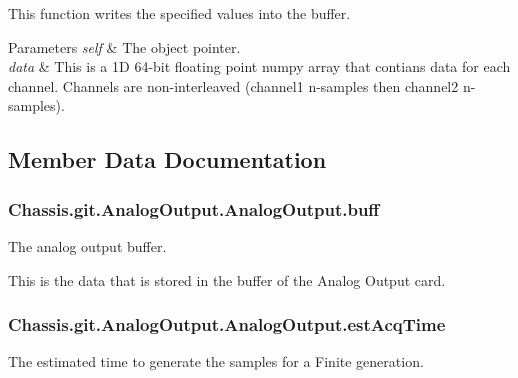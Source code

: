 This function writes the specified values into the buffer. 


\begin{DoxyParams}{Parameters}
{\em self} & The object pointer. \\
\hline
{\em data} & This is a 1\-D 64-\/bit floating point numpy array that contians data for each channel. Channels are non-\/interleaved (channel1 n-\/samples then channel2 n-\/samples). \\
\hline
\end{DoxyParams}


\subsection{Member Data Documentation}
\hypertarget{class_chassis_8git_1_1_analog_output_1_1_analog_output_a3b5a60696ee0dfe637469f9087367933}{
\subsubsection[{buff}]{\setlength{\rightskip}{0pt plus 5cm}Chassis.\-git.\-Analog\-Output.\-Analog\-Output.\-buff}}\label{class_chassis_8git_1_1_analog_output_1_1_analog_output_a3b5a60696ee0dfe637469f9087367933}


The analog output buffer. 

This is the data that is stored in the buffer of the Analog Output card. \hypertarget{class_chassis_8git_1_1_analog_output_1_1_analog_output_a08a90c17370cd645157b45d891d82f74}{
\subsubsection[{est\-Acq\-Time}]{\setlength{\rightskip}{0pt plus 5cm}Chassis.\-git.\-Analog\-Output.\-Analog\-Output.\-est\-Acq\-Time}}\label{class_chassis_8git_1_1_analog_output_1_1_analog_output_a08a90c17370cd645157b45d891d82f74}


The estimated time to generate the samples for a Finite generation. 

